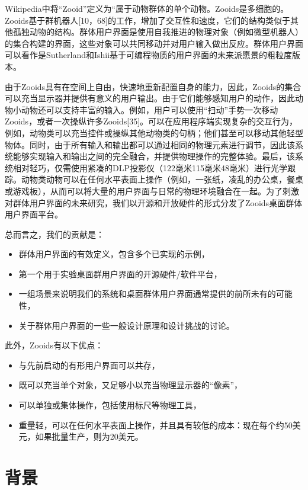 Wikipedia中将“Zooid”定义为“属于动物群体的单个动物。Zooids是多细胞的。Zooids基于群机器人[10，68]的工作，增加了交互性和速度，它们的结构类似于其他孤独动物的结构。群体用户界面是使用自我推进的物理对象（例如微型机器人）的集合构建的界面，这些对象可以共同移动并对用户输入做出反应。群体用户界面可以看作是Sutherland和Ishii基于可编程物质的用户界面的未来派愿景的粗粒度版本。

由于Zooids具有在空间上自由，快速地重新配置自身的能力，因此，Zooids的集合可以充当显示器并提供有意义的用户输出。由于它们能够感知用户的动作，因此动物小动物还可以支持丰富的输入。例如，用户可以使用“扫动”手势一次移动Zooids，或者一次操纵许多Zooids[35]。可以在应用程序端实现复杂的交互行为，例如，动物类可以充当控件或操纵其他动物类的句柄；他们甚至可以移动其他轻型物体。同时，由于所有输入和输出都可以通过相同的物理元素进行调节，因此该系统能够实现输入和输出之间的完全融合，并提供物理操作的完整体验。最后，该系统相对轻巧，仅需使用紧凑的DLP投影仪（122毫米115毫米48毫米）进行光学跟踪。动物类动物可以在任何水平表面上操作（例如，一张纸，凌乱的办公桌，餐桌或游戏板），从而可以将大量的用户界面与日常的物理环境融合在一起。为了刺激对群体用户界面的未来研究，我们以开源和开放硬件的形式分发了Zooids桌面群体用户界面平台。

总而言之，我们的贡献是：

\begin{itemize}
    \item 群体用户界面的有效定义，包含多个已实现的示例，
    \item 第一个用于实验桌面群用户界面的开源硬件/软件平台，
    \item 一组场景来说明我们的系统和桌面群体用户界面通常提供的前所未有的可能性，
    \item 关于群体用户界面的一些一般设计原理和设计挑战的讨论。
\end{itemize}

此外，Zooids有以下优点：

\begin{itemize}
    \item 与先前启动的有形用户界面可以共存，
    \item 既可以充当单个对象，又足够小以充当物理显示器的“像素”，
    \item 可以单独或集体操作，包括使用标尺等物理工具，
    \item 重量轻，可以在任何水平表面上操作，并且具有较低的成本：现在每个约50美元，如果批量生产，则为20美元。
\end{itemize}

\section{背景}

